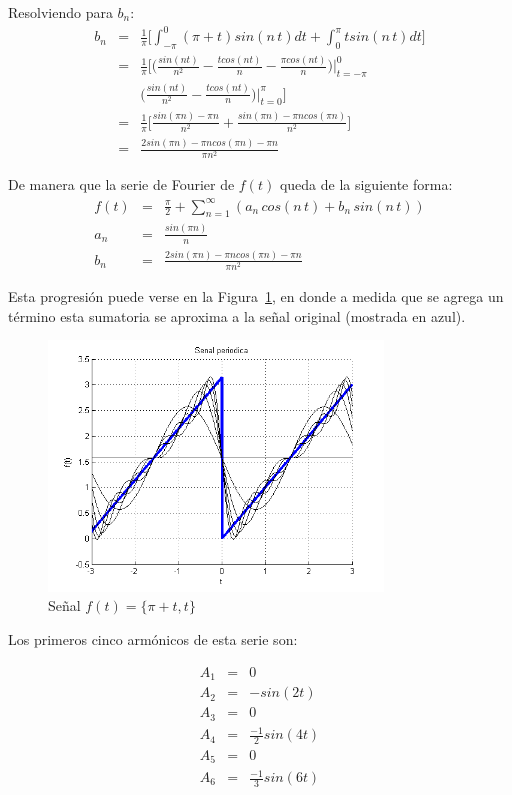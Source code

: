 \documentclass[twocolumn]{article}
\begin{document}
Resolviendo para $b_n$:
\begin{eqnarray*}
b_n &=&  \frac{1}{\pi} \bigg[ \int_{-\pi}^{0}(\pi + t)sin(n\,t) dt + \int_{0}^{\pi}tsin(n\,t) dt \bigg] \\
&=&  \frac{1}{\pi} \bigg[ \bigg(\frac{sin(n t)}{n^{2}} - \frac{tcos(n t)}{n} - \frac{\pi cos(n t)}{n}\bigg)\bigg|_{t=-\pi}^{0}\\
& & \bigg(\frac{sin(n t)}{n^{2}} - \frac{tcos(n t)}{n}\bigg)\bigg|_{t=0}^{\pi} \bigg] \\
&=& \frac{1}{\pi} \bigg[ \frac{sin(\pi n)-\pi n}{n^{2}} + \frac{sin(\pi n)-\pi n cos(\pi n)}{n^{2}} \bigg]\\
&=& \frac{2sin(\pi n)-\pi n cos(\pi n) - \pi n}{\pi n^{2}}
\end{eqnarray*}

De manera que la serie de Fourier de $f(t)$ queda de la siguiente forma:
\begin{eqnarray*}
f(t) &=& \frac{\pi}{2} + \sum_{n=1}^\infty\left(a_n\,cos(n\,t)+ b_n\,sin(n\,t)\right)\\
a_n &=&  \frac{sin(\pi n)}{n} \\
b_n &=&   \frac{2sin(\pi n)-\pi n cos(\pi n) - \pi n}{\pi n^{2}}
\end{eqnarray*}

Esta progresión puede verse en la Figura~\ref{fig_1d}, en donde a medida que se agrega un término esta sumatoria se aproxima a la señal original (mostrada en azul).

\begin{figure}[!t]
\centering
\includegraphics[width=3.5in]{imgs/piece.png}
\caption{Señal $f(t) = \{ \pi +t, t \}$}
\label{fig_1d}
\end{figure}

Los primeros cinco armónicos de esta serie son:

\begin{eqnarray*}
A_1 &=& 0 \\
A_2 &=& - sin(2t) \\
A_3 &=& 0 \\
A_4 &=& \frac{-1}{2} sin(4t) \\
A_5 &=& 0 \\
A_6 &=& \frac{-1}{3} sin(6t) \\
\end{eqnarray*}
\end{document}
